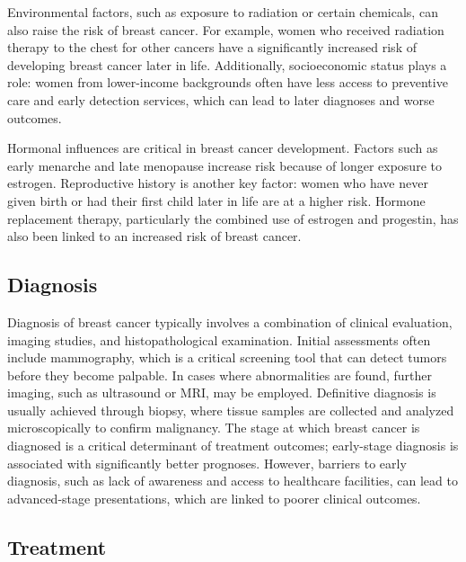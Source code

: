 Environmental factors, such as exposure to radiation or certain chemicals, can
also raise the risk of breast cancer.
For example, women who received radiation therapy to the chest for other
cancers have a significantly increased risk of developing breast cancer later
in life\supercite{froes_brandao_prolactin_2016}.
Additionally, socioeconomic status plays a role: women from lower-income
backgrounds often have less access to preventive care and early detection
services, which can lead to later diagnoses and worse
outcomes\supercite{cunningham_mind_2013}.

Hormonal influences are critical in breast cancer development.
Factors such as early menarche and late menopause increase risk because of
longer exposure to estrogen\supercite{nounu_sex_2022}.
Reproductive history is another key factor: women who have never given birth or
had their first child later in life are at a higher
risk\supercite{claudia_admoun_etiology_2022}.
Hormone replacement therapy, particularly the combined use of estrogen and
progestin, has also been linked to an increased risk of breast
cancer\supercite{turner_meta-analysis_2011}.

\subsection{Diagnosis}

Diagnosis of breast cancer typically involves a combination of clinical
evaluation, imaging studies, and histopathological examination.
Initial assessments often include mammography, which is a critical screening
tool that can detect tumors before they become
palpable\supercite{hameed_breast_2020}.
In cases where abnormalities are found, further imaging, such as ultrasound or
MRI, may be employed.
Definitive diagnosis is usually achieved through biopsy, where tissue samples
are collected and analyzed microscopically to confirm
malignancy\supercite{hameed_breast_2020}.
The stage at which breast cancer is diagnosed is a critical determinant of
treatment outcomes; early-stage diagnosis is associated with significantly
better prognoses\supercite{getachew_perceived_2020}.
However, barriers to early diagnosis, such as lack of awareness and access to
healthcare facilities, can lead to advanced-stage presentations, which are
linked to poorer clinical
outcomes\supercite{getachew_perceived_2020,dickens_stage_2014}.

\subsection{Treatment}

